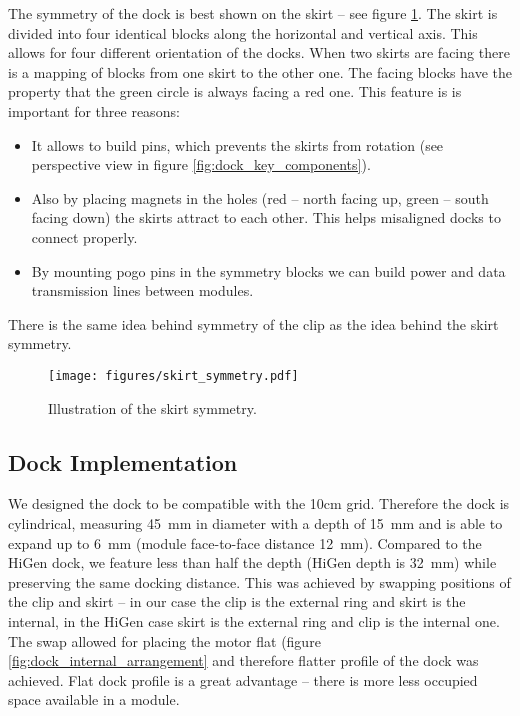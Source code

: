 The symmetry of the dock is best shown on the skirt -- see figure
\ref{fig:dock_skirt_symmetry}. The skirt is divided into four identical blocks
along the horizontal and vertical axis. This allows for four different
orientation of the docks. When two skirts are facing there is a mapping of
blocks from one skirt to the other one. The facing blocks have the property that
the green circle is always facing a red one. This feature is is important for
three reasons:
\begin{itemize}
    \item It allows to build pins, which prevents the skirts from rotation (see
    perspective view in figure \ref{fig:dock_key_components}).
    \item Also by placing magnets in the holes (red -- north facing up, green --
    south facing down) the skirts attract to each other. This helps misaligned
    docks to connect properly.
    \item By mounting pogo pins  in the symmetry blocks we can build
    power and data transmission lines between modules.
\end{itemize}
There is the same idea behind symmetry of the clip as the idea behind the skirt
symmetry.

\begin{figure}[h!]
    \centering
    \texttt{[image: figures/skirt\_symmetry.pdf]}
    \caption{Illustration of the skirt symmetry.}
    \label{fig:dock_skirt_symmetry}
\end{figure}

\subsection{Dock Implementation}

We designed the dock to be compatible with the 10cm grid. Therefore the dock is
cylindrical, measuring 45~mm in diameter with a depth of 15~mm and is able to
expand up to 6~mm (module face-to-face distance 12~mm). Compared to the HiGen
dock, we feature less than half the depth (HiGen depth is 32~mm) while
preserving the same docking distance. This was achieved by swapping positions of
the clip and skirt -- in our case the clip is the external ring and skirt is the
internal, in the HiGen case skirt is the external ring and clip is the internal
one. The swap allowed for placing the motor flat (figure
\ref{fig:dock_internal_arrangement} and therefore flatter profile of the dock
was achieved. Flat dock profile is a great advantage -- there is more less
occupied space available in a module.

